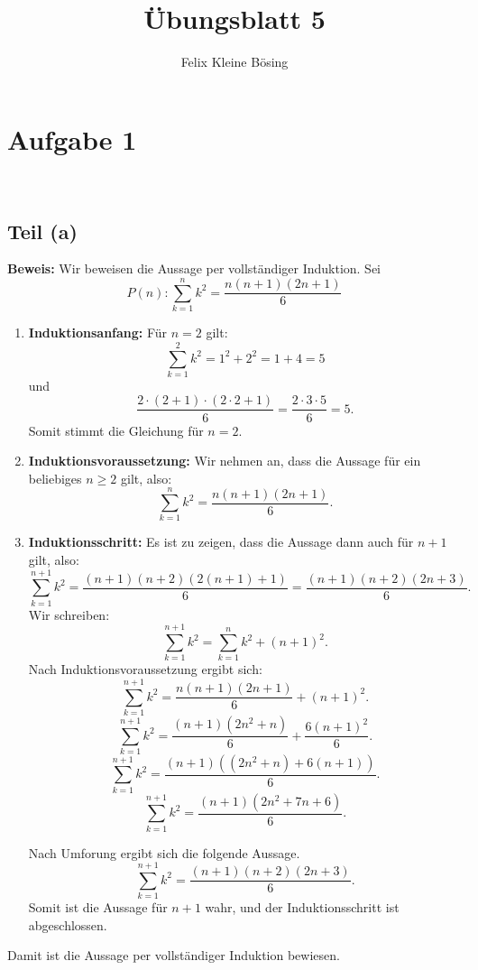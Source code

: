 \documentclass[11pt]{article}
\begin{document}
\title{Übungsblatt 5}
\author{Felix Kleine Bösing}
\maketitle

\section*{Aufgabe 1}

\
\subsection*{Teil (a)}

\textbf{Beweis:} Wir beweisen die Aussage per vollständiger Induktion. Sei
\[
P(n) : \sum_{k=1}^n k^2 = \frac{n(n+1)(2n+1)}{6}
\]

\begin{enumerate}
    \item \textbf{Induktionsanfang:} Für \( n = 2 \) gilt:
    \[
    \sum_{k=1}^2 k^2 = 1^2 + 2^2 = 1 + 4 = 5
    \]
    und
    \[
    \frac{2 \cdot (2+1) \cdot (2 \cdot 2 + 1)}{6} = \frac{2 \cdot 3 \cdot 5}{6} = 5.
    \]
    Somit stimmt die Gleichung für \( n = 2 \).

    \item \textbf{Induktionsvoraussetzung:} Wir nehmen an, dass die Aussage für ein beliebiges \( n \geq 2 \) gilt, also:
    \[
    \sum_{k=1}^n k^2 = \frac{n(n+1)(2n+1)}{6}.
    \]

    \item \textbf{Induktionsschritt:} Es ist zu zeigen, dass die Aussage dann auch für \( n+1 \) gilt, also:
    \[
    \sum_{k=1}^{n+1} k^2 = \frac{(n+1)(n+2)(2(n+1)+1)}{6} = \frac{(n+1)(n+2)(2n+3)}{6}.
    \]
    Wir schreiben:
    \[
    \sum_{k=1}^{n+1} k^2 = \sum_{k=1}^n k^2 + (n+1)^2.
    \]
    Nach Induktionsvoraussetzung ergibt sich:
    \[
    \sum_{k=1}^{n+1} k^2 = \frac{n(n+1)(2n+1)}{6} + (n+1)^2.
    \]
    \[
    \sum_{k=1}^{n+1} k^2 = \frac{(n+1)(2n^2+n)}{6} + \frac{6(n+1)^2}{6}.
    \]
    \[
    \sum_{k=1}^{n+1} k^2 = \frac{(n+1)((2n^2+n)+6(n+1))}{6}.
    \]
    \[
    \sum_{k=1}^{n+1} k^2 = \frac{(n+1)(2n^2+7n+6)}{6}.
    \]

    Nach Umforung ergibt sich die folgende Aussage.
    \[
    \sum_{k=1}^{n+1} k^2 = \frac{(n+1)(n+2)(2n+3)}{6}.
    \]
    Somit ist die Aussage für \( n+1 \) wahr, und der Induktionsschritt ist abgeschlossen.
\end{enumerate}
Damit ist die Aussage per vollständiger Induktion bewiesen.
\end{document}
